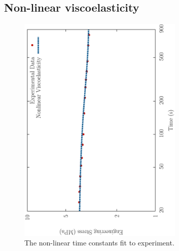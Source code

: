 \subsection{Non-linear viscoelasticity}
\label{non-linear-viscoelasticity}

\begin{figure}[!hpt]
\centering
\includegraphics[width=0.7\textwidth,angle=270]{images/examples/eulerian/viscoelasticity/provenzano-data-comparison}
\caption{The non-linear time constants fit to experiment.} 
\label{provenzano-data-fit}
\end{figure}

